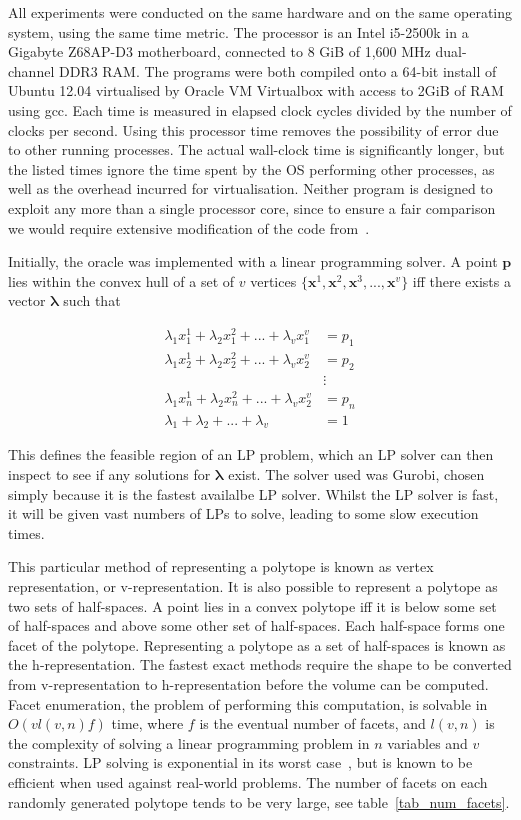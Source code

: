 All experiments were conducted on the same hardware and on the same operating system, using the same time metric. The processor is an Intel i5-2500k in a Gigabyte Z68AP-D3 motherboard, connected to 8 GiB of 1,600 MHz dual-channel DDR3 RAM. The programs were both compiled onto a 64-bit install of Ubuntu 12.04 virtualised by Oracle VM Virtualbox with access to 2GiB of RAM using gcc. Each time is measured in elapsed clock cycles divided by the number of clocks per second. Using this processor time removes the possibility of error due to other running processes. The actual wall-clock time is significantly longer, but the listed times ignore the time spent by the OS performing other processes, as well as the overhead incurred for virtualisation. Neither program is designed to exploit any more than a single processor core, since to ensure a fair comparison we would require extensive modification of the code from~\cite{Bueler98}.

Initially, the oracle was implemented with a linear programming solver. A point ${\bm p}$ lies within the convex hull of a set of $v$ vertices $\{{\bm x}^1, {\bm x}^2, {\bm x}^3, ..., {\bm x}^v\}$ iff there exists a vector ${\bm \lambda}$ such that

\begin{align*}
\lambda_1 x^1_1 + \lambda_2 x^2_1 + ... + \lambda_v x^v_1 &= p_1 \\
\lambda_1 x^1_2 + \lambda_2 x^2_2 + ... + \lambda_v x^v_2 &= p_2 \\
&\vdots \\
\lambda_1 x^1_n + \lambda_2 x^2_n + ... + \lambda_v x^v_2 &= p_n \\
\lambda_1 + \lambda_2 + ... + \lambda_v &= 1
\end{align*}

This defines the feasible region of an LP problem, which an LP solver can then inspect to see if any solutions for ${\bm \lambda}$ exist. The solver used was Gurobi, chosen simply because it is the fastest availalbe LP solver. Whilst the LP solver is fast, it will be given vast numbers of LPs to solve, leading to some slow execution times.

This particular method of representing a polytope is known as vertex representation, or v-representation. It is also possible to represent a polytope as two sets of half-spaces. A point lies in a convex polytope iff it is below some set of half-spaces and above some other set of half-spaces. Each half-space forms one facet of the polytope. Representing a polytope as a set of half-spaces is known as the h-representation. The fastest exact methods require the shape to be converted from v-representation to h-representation before the volume can be computed. Facet enumeration, the problem of performing this computation, is solvable in $O(vl(v,n)f)$ time\cite{Fukuda97}, where $f$ is the eventual number of facets, and $l(v,n)$ is the complexity of solving a linear programming problem in $n$ variables and $v$ constraints. LP solving is exponential in its worst case~\cite{Klee72}, but is known to be efficient when used against real-world problems. The number of facets on each randomly generated polytope tends to be very large, see table~\ref{tab_num_facets}.

